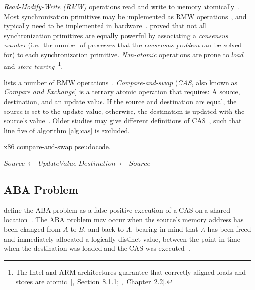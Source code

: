 \emph{Read-Modify-Write (RMW)} operations read and write to memory
atomically~\citep{perfbook2021}. Most synchronization primitives may be
implemented as RMW operations~\citep[Section~5.6]{herlihy2020art}, and
typically need to be implemented in hardware~\citep[Appendix~B.8]{herlihy2020art}.
\citeauthor{herlihy1991wait} proved that not all synchronization primitives are
equally powerful by associating a \emph{consensus number} (i.e.~the number of
processes that the \emph{consensus problem} can be solved for) to each
synchronization primitive. \emph{Non-atomic} operations are prone to \emph{load} and \emph{store
tearing}~\citep[Section~4.3.4]{perfbook2021}\footnote{The Intel and ARM
architectures guarantee that correctly aligned loads and stores are
atomic~[\citealp{intel2021system},~Section~8.1.1;
\citealp{arm2022architecture},~Chapter~2.2].}.

\citeauthor{scott2013shared} lists a number of RMW operations~\citep[Table~2.2]{scott2013shared}.
\emph{Compare-and-swap} (\emph{CAS}, also known as \emph{Compare and Exchange})
is a ternary atomic operation that requires: A source, destination, and an
update value. If the source and destination are equal, the source is set to the
update value, otherwise, the destination is updated with the source's
value~\citep{intel2021inst}.
Older studies may give different definitions of
CAS~\citetext{\citealp{scott2013shared},~Table~2.2;~\citealp{valois1995datastructures},~Appendix~A},
such that line five of algorithm \ref{alg:cas} is excluded.

\SetNoFillComment
{}
\begin{algorithm}[hbt!]
    \caption{x86 compare-and-swap pseudocode.}\label{alg:cas}
        {
            $Source~\gets~UpdateValue$\;
            \;
        }
        $Destination~\gets~Source$\label{alg:line:sourceneqdest}\;
        \;
\end{algorithm}

\subsection{ABA Problem}
\citeauthor{dechev2010understanding} define the ABA problem as a false positive
execution of a CAS on a shared location~\citep{dechev2010understanding}. The ABA
problem may occur when the source's memory address has been changed from $A$ to
$B$, and back to $A$, bearing in mind that $A$ has been freed and immediately
allocated a logically distinct value, between the point in time when the
destination was loaded and the CAS was executed~\citep{dechev2010understanding}.

